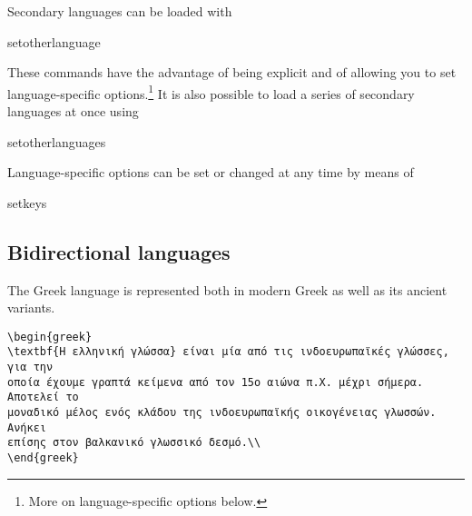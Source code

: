  
 Secondary languages can be loaded with

\begin{docCmd} {setotherlanguage}{}
\end{docCmd}
 These commands have the advantage of being explicit and of allowing you to set
 language-specific options.\footnote{ %
 More on language-specific options below.}
 It is also possible to load a series of secondary languages at once using

\begin{docCmd}{setotherlanguages} { }
\end{docCmd}

 Language-specific options can be set or changed at any time by means of
\begin{docCmd}{setkeys} { }
\end{docCmd}

\subsection{Bidirectional languages}





\begin{comment}
\begin{Arabic}
ّ هو إذ الغاية؛ شريف الفوائد، جم المذهب، عزيز فنّ التاريخ فنّ أنّ اعلم
والملوك سيرهم، في والأنبياء أخلاقهم، في الأمم من الماضين أحوال على يوقفنا
ّ أحوال في يرومه لمن ذلك في الإقتداء فائدة تتم حتّى وسياستهم؛ دولهم في
والدنيا. الدين
\end{Arabic}
\end{comment}

The Greek language is represented both in modern Greek as well as its ancient variants.

\begin{verbatim}
\begin{greek}
\textbf{Η ελληνική γλώσσα} είναι μία από τις ινδοευρωπαϊκές γλώσσες, για την
οποία έχουμε γραπτά κείμενα από τον 15ο αιώνα π.Χ. μέχρι σήμερα. Αποτελεί το
μοναδικό μέλος ενός κλάδου της ινδοευρωπαϊκής οικογένειας γλωσσών. Ανήκει
επίσης στον βαλκανικό γλωσσικό δεσμό.\\	
\end{greek}
\end{verbatim}

